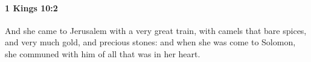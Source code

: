 
		\paragraph{1 Kings 10:2} %
			\label{1KINGS-10-2}

			And she came to Jerusalem with a very great train, with camels that bare spices, and very much gold, and precious stones: and when she was come to Solomon, she communed with him of all that was in her heart.


